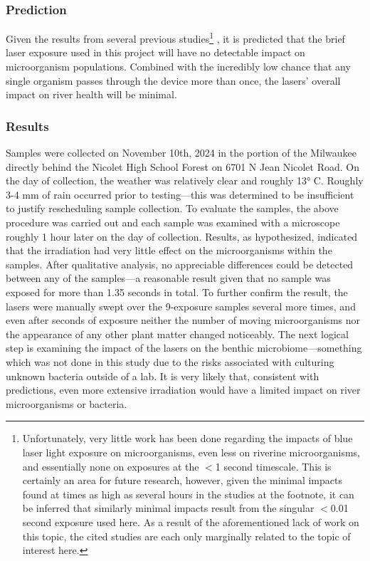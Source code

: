 \documentclass[fleqn,10pt]{SelfArx} %
\begin{document}
	\subsubsection{Prediction}
	Given the results from several previous studies\footnote{Unfortunately, very little work has been done regarding the impacts of blue laser light exposure on microorganisms, even less on riverine microorganisms, and essentially none on exposures at the $<$1 second timescale. This is certainly an area for future research, however, given the minimal impacts found at times as high as several hours in the studies at the footnote, it can be inferred that similarly minimal impacts result from the singular $<$0.01 second exposure used here. As a result of the aforementioned lack of work on this topic, the cited studies are each only marginally related to the topic of interest here. } \cite{Dai_Gupta_Murray_Vrahas_Tegos_Hamblin_2012} \cite{lightExposure} \cite{Gorai_Katayama_Obata_Murata_Taguchi_2014} \cite{lightExposure2},  it is predicted that the brief laser exposure used in this project will have no detectable impact on microorganism populations. Combined with the incredibly low chance that any single organism passes through the device more than once, the lasers' overall impact on river health will be minimal.
	\subsubsection{Results}
	Samples were collected on November 10th, 2024 in the portion of the Milwaukee directly behind the Nicolet High School Forest on 6701 N Jean Nicolet Road. On the day of collection, the weather was relatively clear and roughly 13° C. Roughly 3-4 mm of rain occurred prior to testing—this was determined to be insufficient to justify rescheduling sample collection. To evaluate the samples, the above procedure was carried out and each sample was examined with a microscope roughly 1 hour later on the day of collection. 
	Results, as hypothesized, indicated that the irradiation had very little effect on the microorganisms within the samples. After qualitative analysis, no appreciable differences could be detected between any of the samples—a reasonable result given that no sample was exposed for more than 1.35 seconds in total. To further confirm the result, the lasers were manually swept over the 9-exposure samples several more times, and even after seconds of exposure neither the number of moving microorganisms nor the appearance of any other plant matter changed noticeably. 
	The next logical step is examining the impact of the lasers on the benthic microbiome—something which was not done in this study due to the risks associated with culturing unknown bacteria outside of a lab. It is very likely that, consistent with predictions, even more extensive irradiation would have a limited impact on river microorganisms or bacteria. 
	
\end{document}
